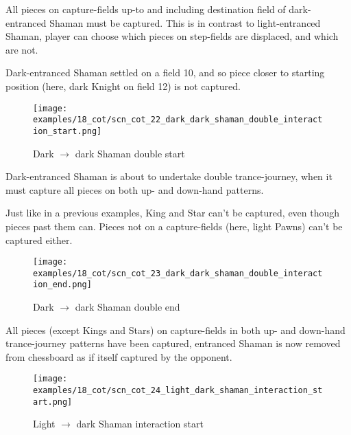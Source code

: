 All pieces on capture-fields up-to and including destination field of dark-entranced Shaman
must be captured. This is in contrast to light-entranced Shaman, player can choose which
pieces on step-fields are displaced, and which are not.

Dark-entranced Shaman settled on a field 10, and so piece closer to starting position (here,
dark Knight on field 12) is not captured.

\clearpage %

\noindent
\begin{figure}[!h]
\texttt{[image: examples/18\_cot/scn\_cot\_22\_dark\_dark\_shaman\_double\_interaction\_start.png]}
\caption{Dark $\rightarrow$ dark Shaman double start}
\label{fig:scn_cot_22_dark_dark_shaman_double_interaction_start}
\end{figure}

Dark-entranced Shaman is about to undertake double trance-journey, when it must capture all
pieces on both up- and down-hand patterns.

Just like in a previous examples, King and Star can't be captured, even though pieces past
them can. Pieces not on a capture-fields (here, light Pawns) can't be captured either.

\clearpage %

\noindent
\begin{figure}[!h]
\texttt{[image: examples/18\_cot/scn\_cot\_23\_dark\_dark\_shaman\_double\_interaction\_end.png]}
\caption{Dark $\rightarrow$ dark Shaman double end}
\label{fig:scn_cot_23_dark_dark_shaman_double_interaction_end}
\end{figure}

All pieces (except Kings and Stars) on capture-fields in both up- and down-hand trance-journey
patterns have been captured, entranced Shaman is now removed from chessboard as if itself
captured by the opponent.

\clearpage %

\noindent
\begin{figure}[!h]
\texttt{[image: examples/18\_cot/scn\_cot\_24\_light\_dark\_shaman\_interaction\_start.png]}
\caption{Light $\rightarrow$ dark Shaman interaction start}
\label{fig:scn_cot_24_light_dark_shaman_interaction_start}
\end{figure}

